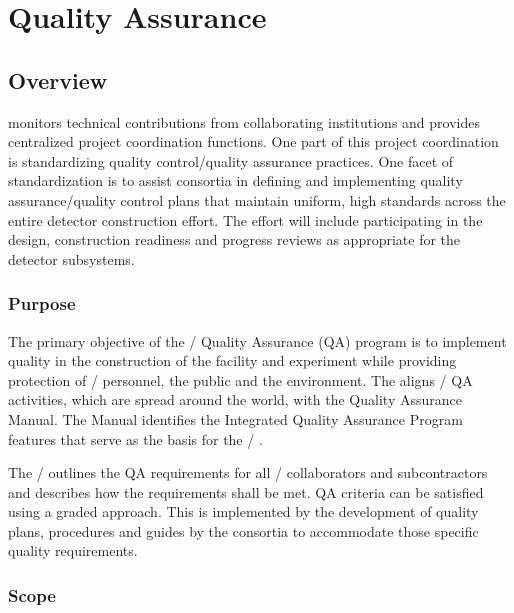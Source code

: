 \chapter{Quality Assurance}
\label{vl:tc-QA}

\section{Overview}

  monitors technical contributions from
collaborating institutions and provides centralized project
coordination functions. One part of this project
coordination is standardizing quality control/quality
assurance practices. One facet of standardization
is to assist consortia in defining and implementing
quality assurance/quality control plans that maintain uniform,
high standards across the entire detector construction
effort. The  effort will include participating in the
design, construction readiness and progress reviews as appropriate for
the  detector subsystems.

\subsection{Purpose}

The primary objective of the / Quality Assurance (QA) program
is to implement quality in the construction of the  facility and
 experiment while providing protection of / personnel, the
public and the environment. The  aligns / QA
activities, which are spread around the world, with the \fnal
Quality Assurance Manual. The Manual identifies the \fnal
Integrated Quality Assurance Program features that serve as the basis
for the / .

The /  outlines the QA requirements for all /
collaborators and subcontractors and describes how the requirements
shall be met. QA criteria can be satisfied using a graded
approach. This  is implemented by the development of quality
plans, procedures and guides by the consortia to accommodate those
specific quality requirements.

\subsection{Scope}


